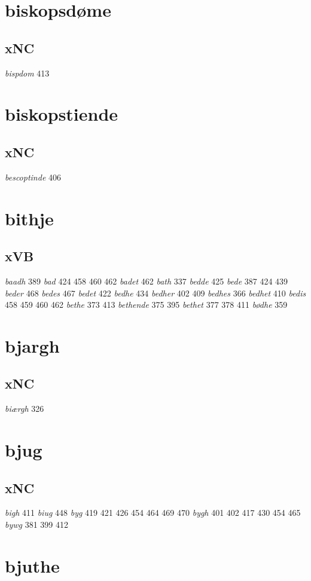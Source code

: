 \documentclass[a4paper,twocolumn]{article}
\begin{document}
\section{biskopsdøme}
\label{sec:org25bd444}
\subsection{xNC}
\label{sec:org2e0b9a5}
\emph{bispdom} 413 
\section{biskopstiende}
\label{sec:orgee76633}
\subsection{xNC}
\label{sec:orge0699b5}
\emph{bescoptinde} 406 
\section{bithje}
\label{sec:orgc0a48e0}
\subsection{xVB}
\label{sec:org50945aa}
\emph{baadh} 389 \emph{bad} 424 458 460 462 \emph{badet} 462 \emph{bath} 337 \emph{bedde} 425 \emph{bede} 387 424 439 \emph{beder} 468 \emph{bedes} 467 \emph{bedet} 422 \emph{bedhe} 434 \emph{bedher} 402 409 \emph{bedhes} 366 \emph{bedhet} 410 \emph{bedis} 458 459 460 462 \emph{bethe} 373 413 \emph{bethende} 375 395 \emph{bethet} 377 378 411 \emph{bødhe} 359 
\section{bjargh}
\label{sec:orgba45750}
\subsection{xNC}
\label{sec:orgb1fbee7}
\emph{biærgh} 326 
\section{bjug}
\label{sec:orgbe38c32}
\subsection{xNC}
\label{sec:org31333bc}
\emph{bigh} 411 \emph{biug} 448 \emph{byg} 419 421 426 454 464 469 470 \emph{bygh} 401 402 417 430 454 465 \emph{bywg} 381 399 412 
\section{bjuthe}
\label{sec:orgd4c1fe9}
\end{document}
